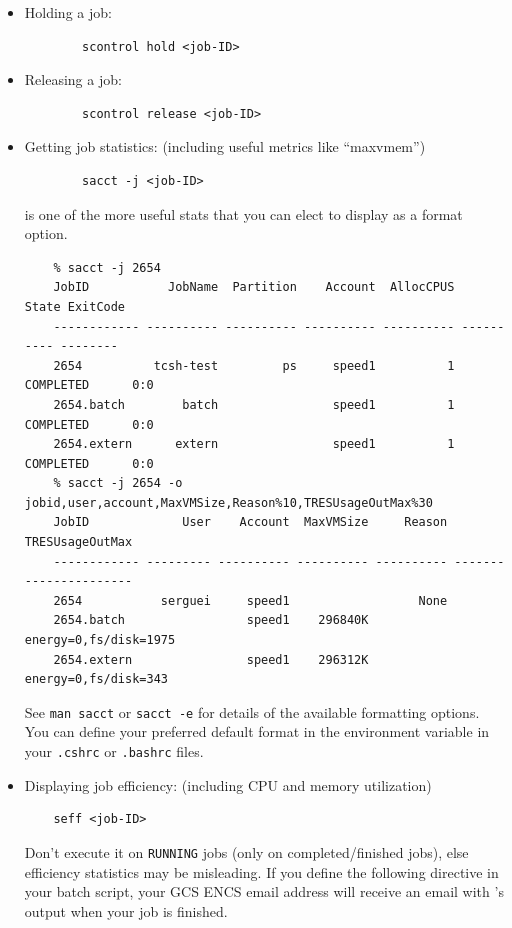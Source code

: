 \begin{itemize}
	\item Holding a job:
	\small
	\begin{verbatim}
		scontrol hold <job-ID>
	\end{verbatim}
	\normalsize

	\item Releasing a job:
	\small
	\begin{verbatim}
		scontrol release <job-ID>
	\end{verbatim}
	\normalsize

	\item Getting job statistics: (including useful metrics like ``maxvmem'')
	\small
	\begin{verbatim}
		sacct -j <job-ID>
	\end{verbatim}
	\normalsize
	
	 is one of the more useful stats that you can elect to display
	as a format option.
	\small
	\begin{verbatim}
	% sacct -j 2654
	JobID           JobName  Partition    Account  AllocCPUS      State ExitCode
	------------ ---------- ---------- ---------- ---------- ---------- --------
	2654          tcsh-test         ps     speed1          1  COMPLETED      0:0
	2654.batch        batch                speed1          1  COMPLETED      0:0
	2654.extern      extern                speed1          1  COMPLETED      0:0
	% sacct -j 2654 -o jobid,user,account,MaxVMSize,Reason%10,TRESUsageOutMax%30
	JobID             User    Account  MaxVMSize     Reason        TRESUsageOutMax
	------------ --------- ---------- ---------- ---------- ----------------------
	2654           serguei     speed1                  None
	2654.batch                 speed1    296840K             energy=0,fs/disk=1975
	2654.extern                speed1    296312K              energy=0,fs/disk=343
	\end{verbatim}
	\normalsize

	See \texttt{man sacct} or \texttt{sacct -e} for details of the available formatting options. 
	You can define your preferred default format in the  environment variable
	in your \texttt{.cshrc} or \texttt{.bashrc} files.

	\item Displaying job efficiency: (including CPU and memory utilization)
	\small
	\begin{verbatim}
	seff <job-ID>
	\end{verbatim}
	\normalsize
	
	Don't execute it on \texttt{RUNNING} jobs (only on completed/finished jobs), else
	efficiency statistics may be misleading. If you define the following 
	directive in your batch script, your GCS ENCS email address will receive an email 
	with 's output when your job is finished.


\end{itemize}
